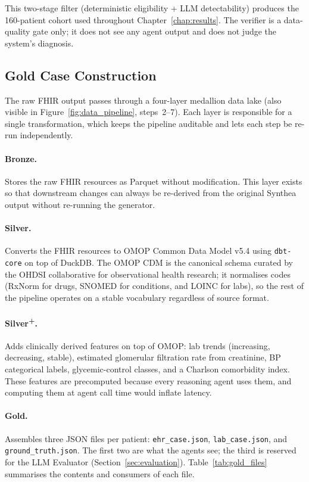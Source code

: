 This two-stage filter (deterministic eligibility + LLM detectability)
produces the 160-patient cohort used throughout
Chapter~\ref{chap:results}. The verifier is a data-quality gate only;
it does not see any agent output and does not judge the system's
diagnosis.

\subsection{Gold Case Construction}
\label{sec:gold_construction}

The raw FHIR output passes through a four-layer medallion data lake
(also visible in Figure~\ref{fig:data_pipeline}, steps~2--7). Each
layer is responsible for a single transformation, which keeps the
pipeline auditable and lets each step be re-run independently.

\paragraph{Bronze.} Stores the raw FHIR resources as Parquet without
modification. This layer exists so that downstream changes can always
be re-derived from the original Synthea output without re-running
the generator.

\paragraph{Silver.} Converts the FHIR resources to OMOP Common Data
Model v5.4 \cite{OMOPCDMv54} using \texttt{dbt-core} on top of DuckDB.
The OMOP CDM is the canonical schema curated by the OHDSI
collaborative \cite{Hripcsak2015OHDSI} for observational health
research; it normalises codes (RxNorm for drugs, SNOMED for
conditions, and LOINC for labs), so the rest of the pipeline operates
on a stable vocabulary regardless of source format.

\paragraph{Silver\textsuperscript{+}.} Adds clinically derived
features on top of OMOP: lab trends (increasing, decreasing, stable),
estimated glomerular filtration rate from creatinine, BP categorical
labels, glycemic-control classes, and a Charlson comorbidity index.
These features are precomputed because every reasoning agent uses
them, and computing them at agent call time would inflate latency.

\paragraph{Gold.} Assembles three JSON files per patient:
\texttt{ehr\_case.json}, \texttt{lab\_case.json}, and
\texttt{ground\_truth.json}. The first two are what the agents see;
the third is reserved for the LLM Evaluator
(Section~\ref{sec:evaluation}).
Table~\ref{tab:gold_files} summarises the contents and consumers of
each file.

